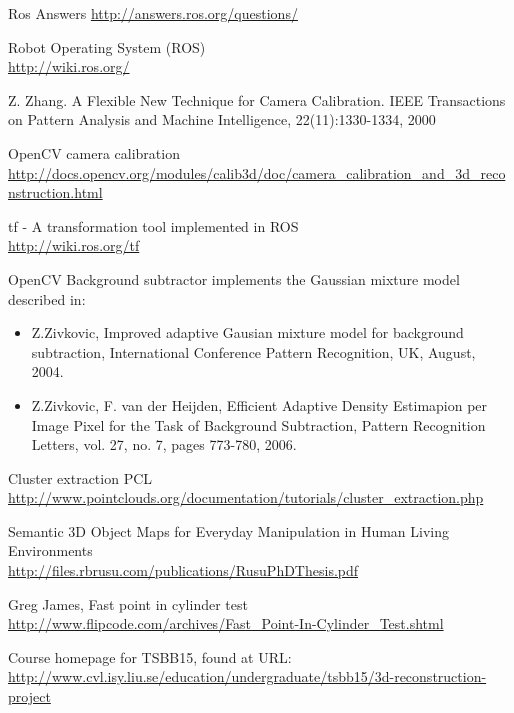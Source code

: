 \documentclass[10pt,a4paper]{article}
\begin{document}
\begin{thebibliography}{9}


Ros Answers
\url{http://answers.ros.org/questions/}

Robot Operating System (ROS)\\
\url{http://wiki.ros.org/}

Z. Zhang. A Flexible New Technique for Camera Calibration. IEEE Transactions on Pattern Analysis and Machine Intelligence, 22(11):1330-1334, 2000

OpenCV camera calibration\\
\url{http://docs.opencv.org/modules/calib3d/doc/camera_calibration_and_3d_reconstruction.html}

tf - A transformation tool implemented in ROS\\
\url{http://wiki.ros.org/tf}

OpenCV Background subtractor implements the Gaussian mixture model described in:
\begin{itemize}
\item Z.Zivkovic, Improved adaptive Gausian mixture model for background subtraction, International Conference Pattern Recognition, UK, August, 2004.
\item Z.Zivkovic, F. van der Heijden, Efficient Adaptive Density Estimapion per Image Pixel for the Task of Background Subtraction, Pattern Recognition Letters, vol. 27, no. 7, pages 773-780, 2006. 
\end{itemize}

Cluster extraction PCL\\
\url{http://www.pointclouds.org/documentation/tutorials/cluster_extraction.php}

Semantic 3D Object Maps for Everyday Manipulation in Human Living Environments\\
\url{http://files.rbrusu.com/publications/RusuPhDThesis.pdf}

Greg James, Fast point in cylinder test\\
\url{http://www.flipcode.com/archives/Fast_Point-In-Cylinder_Test.shtml}

Course homepage for TSBB15, found at URL:
\url{http://www.cvl.isy.liu.se/education/undergraduate/tsbb15/3d-reconstruction-project}

\end{thebibliography}

\end{document}
